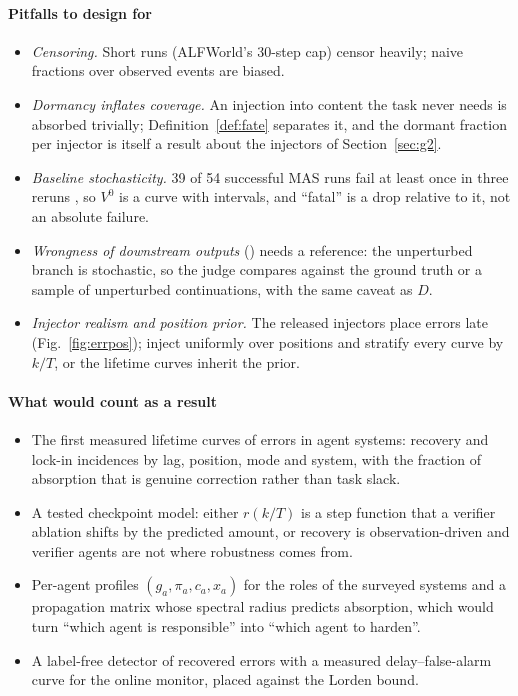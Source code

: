 \paragraph{Pitfalls to design for}
\begin{itemize}[leftmargin=1.1em]
\item \emph{Censoring.} Short runs (ALFWorld's 30-step cap) censor heavily; naive fractions over observed events are biased.
\item \emph{Dormancy inflates coverage.} An injection into content the task never needs is absorbed trivially; Definition~\ref{def:fate} separates it, and the dormant fraction per injector is itself a result about the injectors of Section~\ref{sec:g2}.
\item \emph{Baseline stochasticity.} 39 of 54 successful MAS runs fail at least once in three reruns \cite{luan2026symtrace}, so $V^0$ is a curve with intervals, and ``fatal'' is a drop relative to it, not an absolute failure.
\item \emph{Wrongness of downstream outputs} () needs a reference: the unperturbed branch is stochastic, so the judge compares against the ground truth or a sample of unperturbed continuations, with the same caveat as $D$.
\item \emph{Injector realism and position prior.} The released injectors place errors late (Fig.~\ref{fig:errpos}); inject uniformly over positions and stratify every curve by $k/T$, or the lifetime curves inherit the prior.
\end{itemize}

\paragraph{What would count as a result}
\begin{itemize}[leftmargin=1.1em]
\item The first measured lifetime curves of errors in agent systems: recovery and lock-in incidences by lag, position, mode and system, with the fraction of absorption that is genuine correction rather than task slack.
\item A tested checkpoint model: either $r(k/T)$ is a step function that a verifier ablation shifts by the predicted amount, or recovery is observation-driven and verifier agents are not where robustness comes from.
\item Per-agent profiles $(g_a,\pi_a,c_a,x_a)$ for the roles of the surveyed systems and a propagation matrix whose spectral radius predicts absorption, which would turn ``which agent is responsible'' into ``which agent to harden''.
\item A label-free detector of recovered errors with a measured delay--false-alarm curve for the online monitor, placed against the Lorden bound.
\end{itemize}

